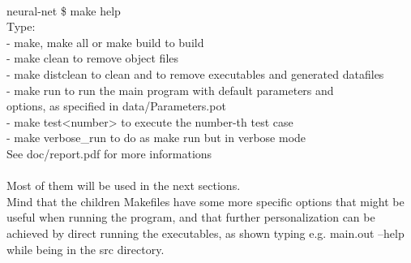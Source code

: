 \documentclass[12pt, a4paper]{report}
\theoremstyle{definition}
\begin{document}
{\\ \ttfamily 
	neural-net \$ make help\\
	Type:\\
	- make, make all or make build to build\\
	- make clean to remove object files\\
	- make distclean to clean and to remove executables and generated datafiles\\
	- make run to run the main program with default parameters and\\
	options, as specified in data/Parameters.pot\\
	- make test<number> to execute the number-th test case\\
	- make verbose\_run to do as make run but in verbose mode\\
	See doc/report.pdf for more informations\\
	\\}
Most of them will be used in the next sections.\\
Mind that the children Makefiles have some more specific options that might be useful when running the program, and that further personalization can be achieved by direct running the executables, as shown typing e.g. {\ttfamily main.out --help} while being in the {\ttfamily src} directory.
\end{document}
